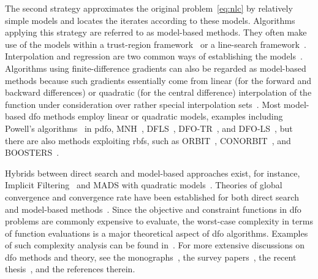 \documentclass{article}
\numberwithin{equation}{section}
\theoremstyle{definition}
\theoremstyle{plain}
\theoremstyle{remark}
\begin{document}
The second strategy approximates the original problem~\eqref{eq:nlc} by relatively simple models and locates the iterates according to these models.
Algorithms applying this strategy are referred to as model-based methods.
They often make use of the models within a trust-region framework~\cite{Conn_Scheinberg_Vicente_2009a} or a line-search framework~\cite{Berahas_Byrd_Nocedal_2019}.
Interpolation and regression are two common ways of establishing the models~\cite{Powell_2001,Conn_Scheinberg_Vicente_2008a,Conn_Scheinberg_Vicente_2008b,Wild_Regis_Shoemaker_2008,Bandeira_Scheinberg_Vicente_2012,Billups_Larson_Graf_2013,Regis_Wild_2017}.
Algorithms using finite-difference gradients can also be regarded as model-based methods because such gradients essentially come from linear (for the forward and backward differences) or quadratic (for the central difference) interpolation of the function under consideration over rather special interpolation sets~\cite[\S~1.4.3]{Ragonneau_2022}.
Most model-based \gls{dfo} methods employ linear or quadratic models, examples including Powell's algorithms~\cite{Powell_1994,Powell_2002,Powell_2006,Powell_2009} in \gls{pdfo}, MNH~\cite{Wild_2008}, DFLS~\cite{Zhang_Conn_Scheinberg_2010}, DFO-TR~\cite{Bandeira_Scheinberg_Vicente_2012}, and DFO-LS~\cite{Cartis_Etal_2019,Hough_Roberts_2022}, but there are also methods exploiting \glspl{rbf}, such as ORBIT~\cite{Wild_Regis_Shoemaker_2008}, CONORBIT~\cite{Regis_Wild_2017}, and BOOSTERS~\cite{Oeuvray_Bierlaire_2009}.

Hybrids between direct search and model-based approaches exist, for instance, Implicit Filtering~\cite[Algorithm~4.7]{Kelley_2011} and MADS with quadratic models~\cite{Conn_LeDigabel_2013}.
Theories of global convergence and convergence rate have been established for both direct search~\cite{Torczon_1997,Kolda_Lewis_Torczon_2003,Vicente_2013,Gratton_Etal_2015,Dodangeh_Vicente_2016} and model-based methods~\cite{Conn_Scheinberg_Toint_1997a,Conn_Scheinberg_Vicente_2009a,Powell_2012,Garmanjani_Judice_Vicente_2016}.
Since the objective and constraint functions in \gls{dfo} problems are commonly expensive to evaluate, the worst-case complexity in terms of function evaluations is a major theoretical aspect of \gls{dfo} algorithms.
Examples of such complexity analysis can be found in~\cite{Vicente_2013,Gratton_Etal_2015,Dodangeh_Vicente_2016,Garmanjani_Judice_Vicente_2016}.
For more extensive discussions on \gls{dfo} methods and theory, see the monographs~\cite{Conn_Scheinberg_Vicente_2009b,Audet_Hare_2017}, the survey papers~\cite{Rios_Sahinidis_2013,Custodio_Scheinberg_Vicente_2017,Larson_Menickelly_Wild_2019}, the recent thesis~\cite{Ragonneau_2022}, and the references therein.
\end{document}
